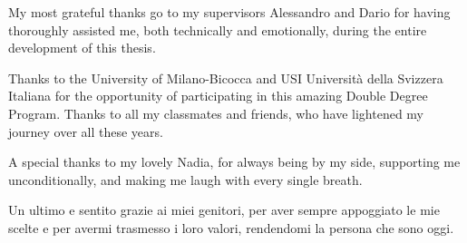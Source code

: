 
My most grateful thanks go to my supervisors Alessandro and Dario for having thoroughly assisted me, both technically and emotionally, during the entire development of this thesis.

\smallskip

Thanks to the University of Milano-Bicocca and USI Università della Svizzera Italiana for the opportunity of participating in this amazing Double Degree Program. Thanks to all my classmates and friends, who have lightened my journey over all these years.

\bigskip

A special thanks to my lovely Nadia, for always being by my side, supporting me unconditionally, and making me laugh with every single breath.

\smallskip

Un ultimo e sentito grazie ai miei genitori, per aver sempre appoggiato le mie scelte e per avermi trasmesso i loro valori, rendendomi la persona che sono oggi.